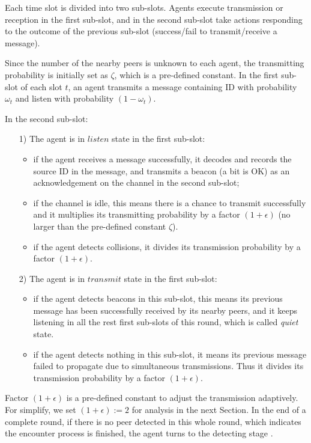 Each time slot is divided into two sub-slots.
Agents execute transmission or reception in the first sub-slot, 
and in the second sub-slot take actions responding to the outcome of the previous sub-slot
(success/fail to transmit/receive a message).

Since the number of the nearby peers is unknown to each agent, 
the transmitting probability is initially set as $\zeta$, which is a pre-defined constant.
In the first sub-slot of each slot $t$, an agent transmits a message containing ID 
with probability $\omega_t$ and listen with probability $(1 - \omega_t)$. 

In the second sub-slot: 
\begin{itemize}
    \item[1)] The agent is in $listen$ state in the first sub-slot:
    \begin{itemize}
    \item if the agent receives a message successfully, it 
    decodes and records the source ID in the message, and
    transmits a beacon (a bit is OK) as an acknowledgement 
    on the channel in the second sub-slot; 
    \item if the channel is idle, this means there is a chance to 
    transmit successfully and it multiplies its transmitting 
    probability by a factor $(1+\epsilon)$ (no larger than the pre-defined constant $\zeta$).
    \item if the agent detects collisions, it divides its transmission 
    probability by a factor ${(1+\epsilon)}$. 
    \end{itemize}
    \item[2)] The agent is in $transmit$ state in the first sub-slot:
    \begin{itemize}
    \item if the agent detects beacons in this sub-slot,
    this means its previous message has been successfully received by its nearby
    peers, and it keeps listening in all the rest first sub-slots of this round,
    which is called \emph{quiet} state.
    \item if the agent detects nothing in this sub-slot, it means its previous message
    failed to propagate due to simultaneous transmissions. Thus it divides its transmission 
    probability by a factor ${(1+\epsilon)}$. 
    \end{itemize}
\end{itemize}

Factor ${(1+\epsilon)}$ is a pre-defined constant to adjust the transmission adaptively.
For simplify, we set $(1+\epsilon) := 2$ for analysis in the next Section.
In the end of a complete round, if there is no peer detected in this whole round, 
which indicates the encounter process is finished, the agent turns to the detecting stage .






